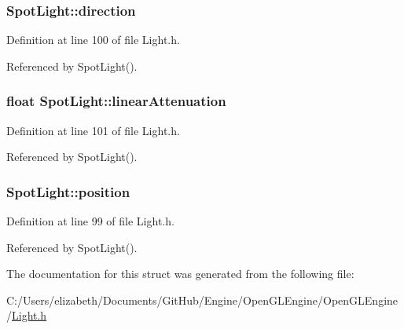 \subsubsection[{\texorpdfstring{direction}{direction}}]{ Spot\+Light\+::direction}\hypertarget{struct_spot_light_a0cc8dadd5f22dc604538ddf849c088dc}{}\label{struct_spot_light_a0cc8dadd5f22dc604538ddf849c088dc}


Definition at line 100 of file Light.\+h.



Referenced by Spot\+Light().

\subsubsection[{\texorpdfstring{linear\+Attenuation}{linearAttenuation}}]{\setlength{\rightskip}{0pt plus 5cm}float Spot\+Light\+::linear\+Attenuation}\hypertarget{struct_spot_light_a8c45a82ddf692a1b23c50aad68cb7dd6}{}\label{struct_spot_light_a8c45a82ddf692a1b23c50aad68cb7dd6}


Definition at line 101 of file Light.\+h.



Referenced by Spot\+Light().

\subsubsection[{\texorpdfstring{position}{position}}]{ Spot\+Light\+::position}\hypertarget{struct_spot_light_a707173cf04742ea60c140e1de36dc90a}{}\label{struct_spot_light_a707173cf04742ea60c140e1de36dc90a}


Definition at line 99 of file Light.\+h.



Referenced by Spot\+Light().



The documentation for this struct was generated from the following file\+:\begin{DoxyCompactItemize}
\item 
C\+:/\+Users/elizabeth/\+Documents/\+Git\+Hub/\+Engine/\+Open\+G\+L\+Engine/\+Open\+G\+L\+Engine/\hyperlink{_light_8h}{Light.\+h}\end{DoxyCompactItemize}
